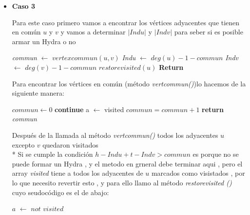 \documentclass[12pt]{article}
\begin{document}
\begin{itemize}
        \item \textbf{Caso 3}
        
        Para este caso primero vamos a encontrar los v\'ertices adyacentes que tienen en com\'un $u$ y $v$ y vamos a determinar  $\vert Indu \vert $  y $\vert Indv \vert $ para seber si 
        es posible armar un Hydra o no 
        \vspace{0.3cm}
        \begin{algorithmic}
            \State \textit{commun} $\leftarrow$ $vertexcommun \left(u,v\right)$ 
            \State \textit{Indu} $\leftarrow$ $deg\left(u\right) -1 - commun$
            \State \textit{Indv} $\leftarrow$ $deg\left(v\right) -1 - commun$
                \State \textit{$restorevisited \left(u\right)$}
                \State \textbf{Return}
            \EndIf 
        \end{algorithmic}

        Para encontrar los v\'ertices en com\'un (m\'etodo \textit{vertcommun()})lo hacemos de la siguiente manera:  

        \begin{algorithmic}
            \State $commun \leftarrow  0$ 
                    \State \textbf{continue}
                \EndIf
                \State a $\leftarrow$ visited 
            \EndFor
                    \State $commun = commun +1 $
                \EndIf
            \EndFor
            \State \textbf{return} \textit{commun} 
        \end{algorithmic}

        Despu\'es de la llamada al m\'etodo  \textit{vertcommun()} todos los adyacentes $u$ excepto $v$ quedaron visitados
        \\*
        Si se cumple la condici\'on   $h - Indu + t - Indv  > commun$ es porque no se puede formar un Hydra , y el metodo en grneral debe terminar aqui , 
        pero el array \textit{visited} tiene a todos los adyacentes de $u$ marcados como visistados , por lo que necesito revertir esto , y para ello llamo 
        al m\'etodo \textit{restorevisited ()} cuyo seudoc\'odigo es el de abajo:   
        
        \vspace{0.5cm}

        \begin{algorithmic}
                \State $a$ $\leftarrow$ $not$ $visited$
            \EndFor
        \end{algorithmic}


\end{itemize}
\end{document}
